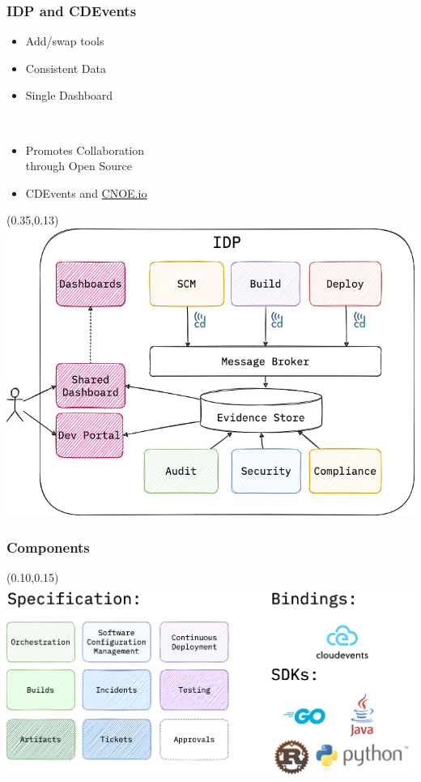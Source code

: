 \documentclass[aspectratio=169,11pt,hyperref={colorlinks=true}]{beamer}
\begin{document}
\begin{grayframe}
  \frametitle{IDP and CDEvents}
  \begin{itemize}
    \item Add/swap tools
    \item Consistent Data
    \item Single Dashboard
  \end{itemize}
  ~ \\
  \begin{itemize}
    \item Promotes Collaboration \\
          through Open Source
    \item CDEvents and \href{https://cnoe.io}{CNOE.io}
  \end{itemize}
  \begin{textblock*}{0.60\paperwidth}(0.35\paperwidth,0.13\paperheight)
    \includegraphics[width=0.60\paperwidth]{img/cdevents-idp-cdevents.png}
  \end{textblock*}
\end{grayframe}

\begin{grayframe}
  \frametitle{Components}
  \begin{textblock*}{0.80\paperwidth}(0.10\paperwidth,0.15\paperheight)
    \includegraphics[width=0.80\paperwidth]{img/cdevents-components.png}
  \end{textblock*}
\end{grayframe}
\end{document}
